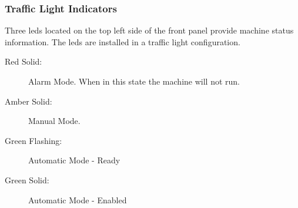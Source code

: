     \subsubsection{Traffic Light Indicators}
        Three \acrshort{led}s located on the top left side of the front panel provide machine status information. The \acrshort{led}s are installed in a traffic light configuration. 

        \begin{description}
            \item[Red Solid:] Alarm Mode. When in this state the machine will not run. 
            \item[Amber Solid:] Manual Mode.
            \item[Green Flashing:]  Automatic Mode - Ready
            \item[Green Solid:]  Automatic Mode - Enabled
        \end{description}
        
    
    
